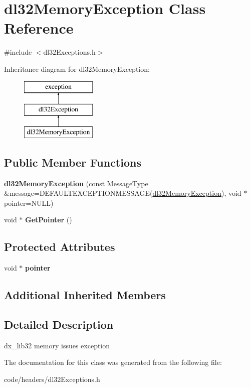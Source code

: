 \hypertarget{classdl32_memory_exception}{\section{dl32\-Memory\-Exception Class Reference}
\label{classdl32_memory_exception}
}


{\ttfamily \#include $<$dl32\-Exceptions.\-h$>$}

Inheritance diagram for dl32\-Memory\-Exception\-:\begin{figure}[H]
\begin{center}
\leavevmode
\includegraphics[height=3.000000cm]{classdl32_memory_exception}
\end{center}
\end{figure}
\subsection*{Public Member Functions}
\begin{DoxyCompactItemize}
\item 
\hypertarget{classdl32_memory_exception_a33169e06d294aee353a8b241a3efe51b}{{\bfseries dl32\-Memory\-Exception} (const Message\-Type \&message=D\-E\-F\-A\-U\-L\-T\-E\-X\-C\-E\-P\-T\-I\-O\-N\-M\-E\-S\-S\-A\-G\-E(\hyperlink{classdl32_memory_exception}{dl32\-Memory\-Exception}), void $\ast$pointer=N\-U\-L\-L)}\label{classdl32_memory_exception_a33169e06d294aee353a8b241a3efe51b}

\item 
\hypertarget{classdl32_memory_exception_a70fa135c9ed94d7c47cdc5d83039b585}{void $\ast$ {\bfseries Get\-Pointer} ()}\label{classdl32_memory_exception_a70fa135c9ed94d7c47cdc5d83039b585}

\end{DoxyCompactItemize}
\subsection*{Protected Attributes}
\begin{DoxyCompactItemize}
\item 
\hypertarget{classdl32_memory_exception_a795cf98f6922ec962dd3e99e4ecb0ce9}{void $\ast$ {\bfseries pointer}}\label{classdl32_memory_exception_a795cf98f6922ec962dd3e99e4ecb0ce9}

\end{DoxyCompactItemize}
\subsection*{Additional Inherited Members}


\subsection{Detailed Description}
dx\-\_\-lib32 memory issues exception 

The documentation for this class was generated from the following file\-:\begin{DoxyCompactItemize}
\item 
code/headers/dl32\-Exceptions.\-h\end{DoxyCompactItemize}
